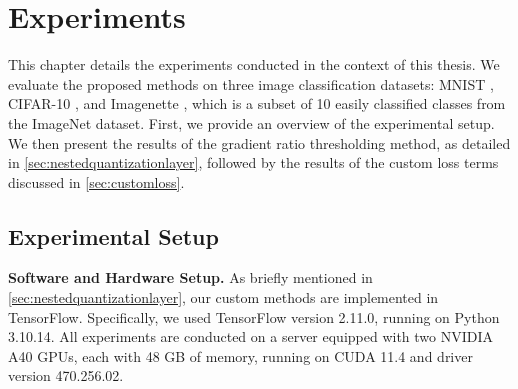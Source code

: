 \chapter{Experiments\label{cha:chapter4}}
\hspace*{1em}This chapter details the experiments conducted in the context of this thesis.
We evaluate the proposed methods on three image classification datasets:
MNIST \cite{lecun2010mnist},
CIFAR-10 \cite{krizhevsky2009learning},
and Imagenette \cite{DBLP:journals/information/HowardG20}, which is a subset of 10 easily classified classes from the ImageNet dataset.
First, we provide an overview of the experimental setup.
We then present the results of the gradient ratio thresholding method, as detailed in \cref{sec:nestedquantizationlayer},
followed by the results of the custom loss terms discussed in \cref{sec:customloss}.


\section{Experimental Setup}
\label{sec:setup}
\hspace*{1em}\textbf{Software and Hardware Setup.} As briefly mentioned in \cref{sec:nestedquantizationlayer},
our custom methods are implemented in TensorFlow.
Specifically, we used TensorFlow version 2.11.0, running on Python 3.10.14. 
All experiments are conducted on a server equipped with two NVIDIA A40 GPUs, 
each with 48 GB of memory, running on CUDA 11.4 and driver version 470.256.02.

